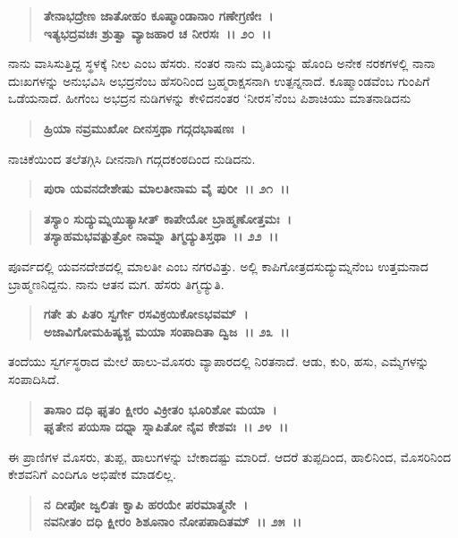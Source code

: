 \begin{verse}
\textbf{ತೇನಾಭದ್ರೇಣ ಜಾತೋಹಂ ಕೂಷ್ಮಾಂಡಾನಾಂ ಗಣೇಗ್ರಣೀಃ~।}\\\textbf{ಇತ್ಯಭದ್ರವಚಃ ಶ್ರುತ್ವಾ ವ್ಯಾಜಹಾರ ಚ ನೀರಸಃ~।। ೨೦~।।}
\end{verse}

ನಾನು ವಾಸಿಸುತ್ತಿದ್ದ ಸ್ಥಳಕ್ಕೆ ನೀಲ ಎಂಬ ಹೆಸರು. ನಂತರ ನಾನು ಮೃತಿಯನ್ನು ಹೊಂದಿ ಅನೇಕ ನರಕಗಳಲ್ಲಿ ನಾನಾ ದುಃಖಗಳನ್ನು ಅನುಭವಿಸಿ ಅಭದ್ರನೆಂಬ ಹೆಸರಿನಿಂದ ಬ್ರಹ್ಮರಾಕ್ಷಸನಾಗಿ ಉತ್ಪನ್ನನಾದೆ. ಕೂಷ್ಮಾಂಡವೆಂಬ ಗುಂಪಿಗೆ ಒಡೆಯನಾದೆ. ಹೀಗೆಂಬ ಅಭದ್ರನ ನುಡಿಗಳನ್ನು ಕೇಳಿದನಂತರ `ನೀರಸ'ನೆಂಬ ಪಿಶಾಚಿಯು ಮಾತನಾಡಿದನು

\begin{verse}
\textbf{ಹ್ರಿಯಾ ನವ್ರಮುಖೋ ದೀನಸ್ತಥಾ ಗದ್ಗದಭಾಷಣಃ~।}
\end{verse}

ನಾಚಿಕೆಯಿಂದ ತಲೆತಗ್ಗಿಸಿ ದೀನನಾಗಿ ಗದ್ಗದಕಂಠದಿಂದ ನುಡಿದನು.

\begin{verse}
\textbf{ಪುರಾ ಯವನದೇಶೇಷು ಮಾಲತೀನಾಮ ವೈ ಪುರೀ~।। ೨೧~।। }
\end{verse}

\begin{verse}
\textbf{ತಸ್ಯಾಂ ಸುದ್ಯುಮ್ನಯಿತ್ಯಾಸೀತ್ ಕಾಪೇಯೋ ಬ್ರಾಹ್ಮಣೋತ್ತಮಃ~।}\\\textbf{ತಸ್ಯಾಹಮಭವತ್ಪುತ್ರೋ ನಾಮ್ನಾ ತಿಗ್ಮದ್ಯುತಿಸ್ತಥಾ~।। ೨೨~।।}
\end{verse}

ಪೂರ್ವದಲ್ಲಿ ಯವನದೇಶದಲ್ಲಿ ಮಾಲತೀ ಎಂಬ ನಗರವಿತ್ತು. ಅಲ್ಲಿ ಕಾಪಿಗೋತ್ರದ\break ಸುದ್ಯುಮ್ನನೆಂಬ ಉತ್ತಮನಾದ ಬ್ರಾಹ್ಮಣನಿದ್ದನು. ನಾನು ಆತನ ಮಗ. ಹೆಸರು ತಿಗ್ಮದ್ಯುತಿ.

\begin{verse}
\textbf{ಗತೇ ತು ಪಿತರಿ ಸ್ವರ್ಗೇ ರಸವಿಕ್ರಯಿಕೋಽಭವಮ್~।}\\\textbf{ಅಜಾವಿಗೋಮಹಿಷ್ಯಶ್ಚ ಮಯಾ ಸಂಪಾದಿತಾ ದ್ವಿಜ~।। ೨೩~।।}
\end{verse}

ತಂದೆಯು ಸ್ವರ್ಗಸ್ಥರಾದ ಮೇಲೆ ಹಾಲು-ಮೊಸರು ವ್ಯಾಪಾರದಲ್ಲಿ ನಿರತನಾದೆ. ಆಡು, ಕುರಿ, ಹಸು, ಎಮ್ಮೆಗಳನ್ನು ಸಂಪಾದಿಸಿದೆ.

\begin{verse}
\textbf{ತಾಸಾಂ ದಧಿ ಘೃತಂ ಕ್ಷೀರಂ ವಿಕ್ರೀತಂ ಭೂರಿಶೋ ಮಯಾ~।}\\\textbf{ಘೃತೇನ ಪಯಸಾ ದಧ್ನಾ ಸ್ನಾಪಿತೋ ನೈವ ಕೇಶವಃ~।। ೨೪~।।}
\end{verse}

ಈ ಪ್ರಾಣಿಗಳ ಮೊಸರು, ತುಪ್ಪ, ಹಾಲುಗಳನ್ನು ಬೇಕಾದಷ್ಟು ಮಾರಿದೆ. ಆದರೆ ತುಪ್ಪದಿಂದ, ಹಾಲಿನಿಂದ, ಮೊಸರಿನಿಂದ ಕೇಶವನಿಗೆ ಎಂದಿಗೂ ಅಭಿಷೇಕ ಮಾಡಲಿಲ್ಲ.

\begin{verse}
\textbf{ನ ದೀಪೋ ಜ್ವಲಿತಃ ಕ್ವಾಪಿ ಹರಯೇ ಪರಮಾತ್ಮನೇ~।}\\\textbf{ನವನೀತಂ ದಧಿ ಕ್ಷೀರಂ ಶಿಶೂನಾಂ ನೋಪಪಾದಿತಮ್~।। ೨೫~।।}
\end{verse}

